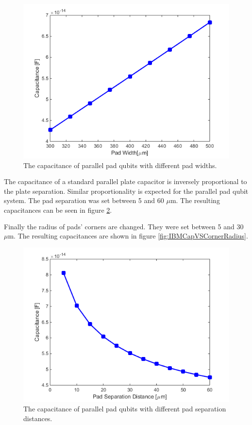 \begin{figure}
	\centering
	\includegraphics[scale = 0.7]{Figures/Capacitance_plots/IBMCapVSWidth}
	\caption{The capacitance of parallel pad qubits with different pad widths.}
	\label{fig:IBMCapVSWidth}
\end{figure}

The capacitance of a standard parallel plate capacitor is inversely proportional to the plate separation. Similar proportionality is expected for the parallel pad qubit system. The pad separation was set between 5 and 60 \(\mu\)m. The resulting capacitances can be seen in figure \ref{fig:IBMCapVSPadSep}.

Finally the radius of pads' corners are changed. They were set between 5 and 30 \(\mu\)m. The resulting capacitances are shown in figure \ref{fig:IBMCapVSCornerRadius}.

\begin{figure}[h]
	\centering
	\includegraphics[scale = 0.7]{Figures/Capacitance_plots/IBMCapVSPadSep}
	\caption{The capacitance of parallel pad qubits with different pad separation distances.}
	\label{fig:IBMCapVSPadSep}
\end{figure}


